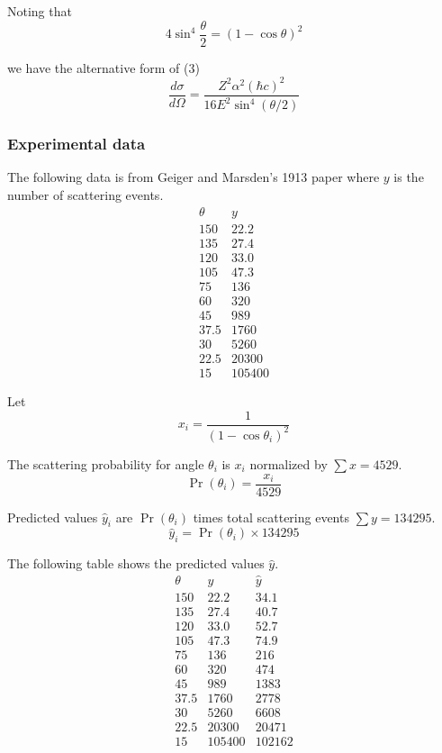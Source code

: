 Noting that
\begin{equation*}
4\sin^4\frac{\theta}{2}=(1-\cos\theta)^2
\end{equation*}

we have the alternative form of (3)
\begin{equation*}
\frac{d\sigma}{d\Omega}=\frac{Z^2\alpha^2(\hbar c)^2}{16E^2\sin^4(\theta/2)}
\end{equation*}

\subsubsection*{Experimental data}
The following data is from Geiger and Marsden's 1913 paper where
$y$ is the number of scattering events.
\begin{equation*}
\begin{matrix}
\theta & y\\
150 & 22.2\\
135 & 27.4\\
120 & 33.0\\
105 & 47.3\\
75 & 136\\
60 & 320\\
45 & 989\\
37.5 & 1760\\
30 & 5260\\
22.5 & 20300\\
15 & 105400
\end{matrix}
\end{equation*}

Let
\begin{equation*}
x_i=\frac{1}{(1-\cos\theta_i)^2}
\end{equation*}

The scattering probability for angle $\theta_i$ is $x_i$ normalized by $\sum x=4529$.
\begin{equation*}
\Pr(\theta_i)=\frac{x_i}{4529}
\end{equation*}

Predicted values $\hat y_i$ are $\Pr(\theta_i)$
times total scattering events $\sum y=134295$.
\begin{equation*}
\hat y_i=\Pr(\theta_i)\times134295
\end{equation*}

The following table shows the predicted values $\hat y$.
\begin{equation*}
\begin{matrix}
\theta & y & \hat y\\
150 & 22.2 & 34.1\\
135 & 27.4 & 40.7\\
120 & 33.0 & 52.7\\
105 & 47.3 & 74.9\\
75 & 136 & 216\\
60 & 320 & 474\\
45 & 989 & 1383\\
37.5 & 1760 & 2778\\
30 & 5260 & 6608\\
22.5 & 20300 & 20471\\
15 & 105400 & 102162
\end{matrix}
\end{equation*}

